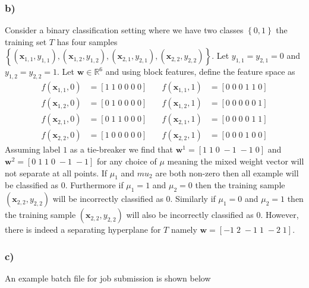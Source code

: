 \subsubsection*{{\bf b)}}
Consider a binary classification setting where we have two classes $\left\{ 0,1 \right\}$ the training set $T$ has four samples $\left\{ \left( \bm{x}_{1,1}, y_{1,1} \right), \left( \bm{x}_{1,2}, y_{1,2} \right), \left( \bm{x}_{2,1}, y_{2,1} \right), \left( \bm{x}_{2,2}, y_{2,2} \right) \right\}$. Let $y_{1,1} = y_{2,1} = 0$ and $y_{1,2} = y_{2,2} = 1$. Let $\bm{w} \in \mathbb{R}^{6}$ and using block features, define the feature space as
\begin{align*}
    f (\bm{x}_{1,1}, 0) &= \left[ 1 \; 1 \; 0 \; 0 \; 0 \; 0 \right] \quad & f (\bm{x}_{1,1}, 1) &= \left[ 0 \; 0 \; 0 \; 1 \; 1 \; 0 \right] \\
    f (\bm{x}_{1,2}, 0) &= \left[ 0 \; 1 \; 0 \; 0 \; 0 \; 0 \right] \quad & f (\bm{x}_{1,2}, 1) &= \left[ 0 \; 0 \; 0 \; 0 \; 0 \; 1 \right] \\
    f (\bm{x}_{2,1}, 0) &= \left[ 0 \; 1 \; 1 \; 0 \; 0 \; 0 \right] \quad & f (\bm{x}_{2,1}, 1) &= \left[ 0 \; 0 \; 0 \; 0 \; 1 \; 1 \right] \\
    f (\bm{x}_{2,2}, 0) &= \left[ 1 \; 0 \; 0 \; 0 \; 0 \; 0 \right] \quad & f (\bm{x}_{2,2}, 1) &= \left[ 0 \; 0 \; 0 \; 1 \; 0 \; 0 \right]
\end{align*}
Assuming label $1$ as a tie-breaker we find that $\bm{w}^{1} = \left[ 1 \; 1 \; 0 \; -1 \; -1 \; 0 \right]$ and $\bm{w}^{2} = \left[ 0 \; 1 \; 1 \; 0 \; -1 \; -1 \right]$ for any choice of $\mu$ meaning the mixed weight vector will not separate at all points. If $\mu_1$ and $mu_2$ are both non-zero then all example will be classified as $0$. Furthermore if $\mu_1 = 1$ and $\mu_2 = 0$ then the training sample $(\bm{x}_{2,2}, y_{2,2})$ will be incorrectly classified as $0$. Similarly if $\mu_1 = 0$ and $\mu_2 = 1$ then the training sample $(\bm{x}_{2,2}, y_{2,2})$ will also be incorrectly classified as $0$. However, there is indeed a separating hyperplane for $T$ namely $\bm{w} = \left[ -1 \; 2 \; -1 \; 1 \; -2 \; 1 \right]$.

\subsubsection*{{\bf c)}}
An example batch file for job submission is shown below
\inputminted[mathescape,
    linenos,
    numbersep=5pt,
    frame=lines,
    framesep=2mm]{bash}{src/batch/PERCEPTRON_1_thread.sh}
    
